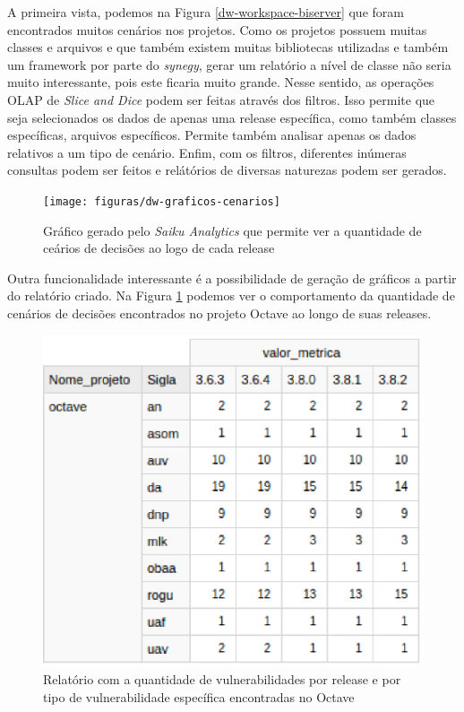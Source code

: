 A primeira vista, podemos na Figura \ref{dw-workspace-biserver} que foram encontrados muitos cenários nos projetos. Como os projetos possuem muitas classes e arquivos e que também existem muitas bibliotecas utilizadas e também um framework por parte do \emph{synegy}, gerar um relatório a nível de classe não seria muito interessante, pois este ficaria muito grande. Nesse sentido, as operações OLAP de \emph{Slice and Dice} podem ser feitas através dos filtros. Isso permite que seja selecionados os dados de apenas uma release específica, como também classes específicas, arquivos específicos. Permite também analisar apenas os dados relativos a um tipo de cenário. Enfim, com os filtros, diferentes inúmeras consultas podem ser feitos e relátórios de diversas naturezas podem ser gerados.


\begin{figure}[H]
	\centering
	\texttt{[image: figuras/dw-graficos-cenarios]}
	\caption{Gráfico gerado pelo \emph{Saiku Analytics} que permite ver a quantidade de ceários de decisões ao logo de cada release}
	\label{dw-graficos-cenarios}
\end{figure}

Outra funcionalidade interessante é a possibilidade de geração de gráficos a partir do relatório criado. Na Figura \ref{dw-graficos-cenarios} podemos ver o comportamento da quantidade de cenários de decisões encontrados no projeto Octave ao longo de suas releases. 


\begin{figure}[H]
	\centering
	\includegraphics[scale=0.7]{figuras/dw-relatorio-octave}
	\caption{Relatório com a quantidade de vulnerabilidades por release e por tipo de vulnerabilidade específica encontradas no Octave}
	\label{dw-relatorio-octave}
\end{figure}

